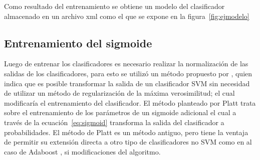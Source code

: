 Como resultado del entrenamiento se obtiene un modelo del clasificador almacenado en un archivo xml como el que se expone en la figura~\ref{fig:ejmodelo} 

\subsection{Entrenamiento del sigmoide}

Luego de entrenar los clasificadores es necesario realizar la normalización de las salidas de los clasificadores, para esto se utilizó un método propuesto por \cite{Platt1999}, quien indica que es posible transformar la salida de un clasificador SVM sin necesidad de utilizar un método de regularización de la máxima verosimilitud; el cual modificaría el entrenamiento del clasificador. El método planteado por Platt trata sobre el entrenamiento de los parámetros de un sigmoide adicional el cual a través de la ecuación~\ref{eq:sigmoid} transforma la salida del clasificador a probabilidades. El método de Platt es un método antiguo, pero tiene la ventaja de permitir su extensión directa a otro tipo de clasificadores no SVM como en al caso de Adaboost \citep{Niculescu-mizil2005}, si modificaciones del algoritmo. 

